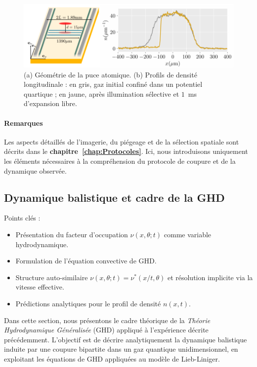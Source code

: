 \begin{figure}[!htb]
\centering
\includegraphics[width=0.9\linewidth]{BiPart/Figures/Atom_chip.png}
\caption{(a) Géométrie de la puce atomique. (b) Profils de densité longitudinale : en gris, gaz initial confiné dans un potentiel quartique ; en jaune, après illumination sélective et $1$~ms d’expansion libre.}
\label{fig:setup}
\end{figure}

\paragraph{Remarques}
Les aspects détaillés de l’imagerie, du piégeage et de la sélection spatiale sont décrits dans le \textbf{chapitre~\ref{chap:Protocoles}}. Ici, nous introduisons uniquement les éléments nécessaires à la compréhension du protocole de coupure et de la dynamique observée.


\subsection{Dynamique balistique et cadre de la GHD}
\label{sec.GHDpredictions}\label{sec:ghd}

{\color{blue}
Points clés :
\begin{itemize}
	\item Présentation du facteur d’occupation $\nu(x,\theta;t)$ comme variable hydrodynamique.
	\item Formulation de l’équation convective de GHD.
	\item Structure auto-similaire $\nu(x,\theta;t) = \nu^*(x/t,\theta)$ et résolution implicite via la vitesse effective.
	\item Prédictions analytiques pour le profil de densité $n(x,t)$.
\end{itemize}
}


Dans cette section, nous présentons le cadre théorique de la \emph{Théorie Hydrodynamique Généralisée} (GHD) appliqué à l’expérience décrite précédemment. L’objectif est de décrire analytiquement la dynamique balistique induite par une coupure bipartite dans un gaz quantique unidimensionnel, en exploitant les équations de GHD appliquées au modèle de Lieb-Liniger.

